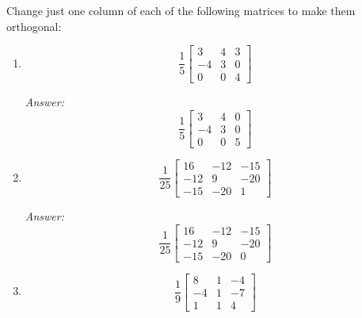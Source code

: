 \documentclass[letterpaper]{article}
\newcommand{\ans}{\textit{Answer: }}
\newenvironment{question}[2][Question]{\begin{trivlist}
\item[\hskip \labelsep {\bfseries #1}\hskip \labelsep {\bfseries #2.}]}{\end{trivlist}}
\newcommand{\printobj}[1]{\py{utils.print.print_object(#1)}}
\begin{document}
\begin{question}{6.70}
  Change just one column of each of the following matrices to make them
  orthogonal:

  \begin{enumerate}[label=(\alph*)]
    \item 
    $$
    \frac{1}{5} \left[ \begin{array}{rrr}{3} & {4} & {3} \\ {-4} & {3} & {0} \\ {0} & {0} & {4}\end{array}\right]
    $$

    \ans
    $$
    \frac{1}{5} \left[ \begin{array}{rrr}{3} & {4} & {0} \\ {-4} & {3} & {0} \\ {0} & {0} & {5}\end{array}\right]
    $$
    



    



    \item 
    $$
    \frac{1}{25} \left[ \begin{array}{rrr}{16} & {-12} & {-15} \\ {-12} & {9} & {-20} \\ {-15} & {-20} & {1}\end{array}\right]
    $$

    \ans 
    $$
    \frac{1}{25} \left[ \begin{array}{rrr}{16} & {-12} & {-15} \\ {-12} & {9} & {-20} \\ {-15} & {-20} & {0}\end{array}\right]
    $$


    \item 
    $$
    \frac{1}{9} \left[ \begin{array}{rrr}{8} & {1} & {-4} \\ {-4} & {1} & {-7} \\ {1} & {1} & {4}\end{array}\right]
    $$


\end{enumerate}
\end{question}
\end{document}
